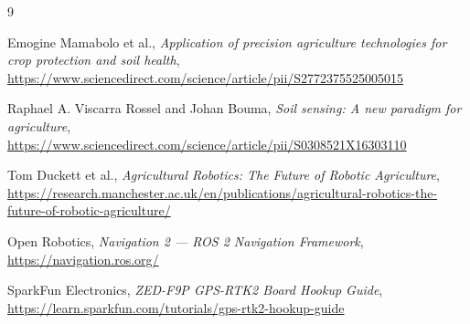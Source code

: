 \documentclass [12pt, a4paper]{article}
\begin{document}


\renewcommand{\contentsname}{\centering Sommaire}
\tableofcontents
\thispagestyle{empty}
\setcounter{page}{0}

\newpage







\newpage
\begin{thebibliography}{9}

  Emogine Mamabolo et al., \emph{Application of precision agriculture technologies for crop protection and soil health},
  \url{https://www.sciencedirect.com/science/article/pii/S2772375525005015}

  Raphael A. Viscarra Rossel and Johan Bouma, \emph{Soil sensing: A new paradigm for agriculture},
  \url{https://www.sciencedirect.com/science/article/pii/S0308521X16303110}

  Tom Duckett et al., \emph{Agricultural Robotics: The Future of Robotic Agriculture},
  \url{https://research.manchester.ac.uk/en/publications/agricultural-robotics-the-future-of-robotic-agriculture/}

  Open Robotics, \emph{Navigation 2 — ROS 2 Navigation Framework},
  \url{https://navigation.ros.org/}

  SparkFun Electronics, \emph{ZED-F9P GPS-RTK2 Board Hookup Guide},
  \url{https://learn.sparkfun.com/tutorials/gps-rtk2-hookup-guide}


\end{thebibliography}
\end{document}
